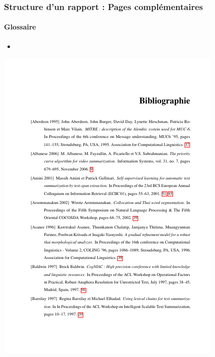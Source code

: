 \documentclass[xcolor=table]{beamer}
\begin{document}
\begin{frame}
\frametitle{Structure d'un rapport : Pages complémentaires}
\framesubtitle{Glossaire}

\begin{minipage}{0.52\textwidth}
	\begin{itemize}
		\item 
	\end{itemize}
\end{minipage}
\begin{minipage}{0.42\textwidth}
	\includegraphics[width=\textwidth]{..//img/Bweb03-redaction/bibliographie.png}
\end{minipage}

\end{frame}
\end{document}
